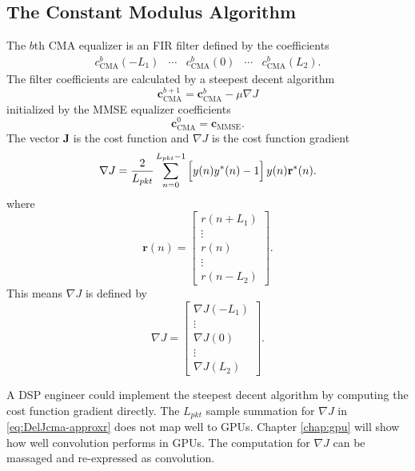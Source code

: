 \subsection{The Constant Modulus Algorithm}
\label{sec:CMA}
The $b$th CMA equalizer is an FIR filter defined by the coefficients
\begin{equation}
\begin{matrix}
c_\text{CMA}^b(-L_1) & \cdots & c_\text{CMA}^b(0) & \cdots & c_\text{CMA}^b(L_2).
\end{matrix}
\end{equation}
The filter coefficients are calculated by a steepest decent algorithm 
\begin{equation}
\mathbf{c}_\text{CMA}^{b+1} = \mathbf{c}_\text{CMA}^{b}-\mu \nabla J
\label{eq:steepest}
\end{equation}
initialized by the MMSE equalizer coefficients
\begin{equation}
\mathbf{c}_\text{CMA}^0 = \mathbf{c}_\text{MMSE}.
\end{equation}
The vector $\mathbf{J}$ is the cost function and $\nabla J$ is the cost function gradient \cite[eq. (352)]{PAQ-phase1}
\begin{equation}
	\nabla J = \frac{2}{L_{pkt}} \sum_{n=0}^{L_{pkt}-1}
	\left[ \vphantom{\displaystyle\sum}  y(n) y^\ast(n) - 1 \right]
	y(n)  \mathbf{r}^\ast(n).
\label{eq:DelJcma-approxr}
\end{equation}
where
\begin{equation}
\mathbf{r}(n) = \begin{bmatrix} r(n+L_1) \\ \vdots \\ r(n) \\ \vdots \\ r(n-L_2) \end{bmatrix}.
\end{equation}
This means $\nabla J$ is defined by
\begin{equation}
\nabla J = \begin{bmatrix} \nabla J(-L_1) \\ \vdots \\ \nabla J(0) \\ \vdots \\ \nabla J(L_2) \end{bmatrix}.
\end{equation}

A DSP engineer could implement the steepest decent algorithm by computing the cost function gradient directly.
The $L_{pkt}$ sample summation for $\nabla J$ in \eqref{eq:DelJcma-approxr} does not map well to GPUs.
Chapter \ref{chap:gpu} will show how well convolution performs in GPUs.
The computation for $\nabla J$ can be massaged and re-expressed as convolution.

